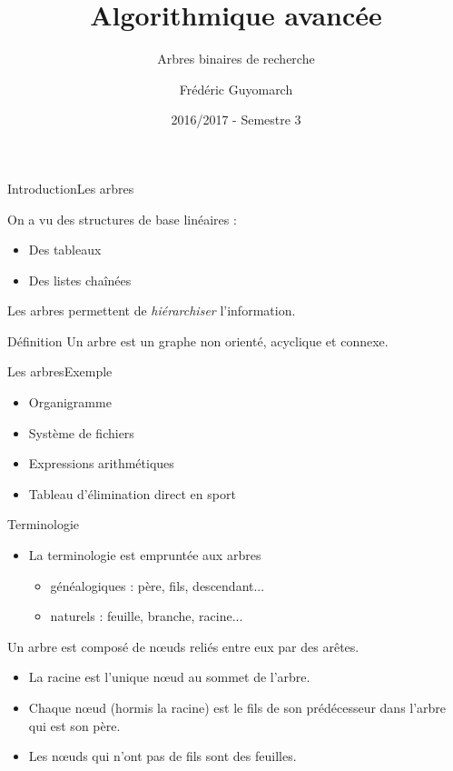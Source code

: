 \documentclass[12pt,a4paper]{beamer}
\title{\textbf{Algorithmique avancée}}
\subtitle{Arbres binaires de recherche}
\author{Frédéric Guyomarch}
\date{2016/2017 - Semestre 3}
\institute %
{

  Université de Lille1\\
  IUT-A de Lille

}
\newcommand{\hl}[1]{\textcolor{blueemph}{#1}}
\begin{document}
\begin{frame}
\titlepage
\end{frame}


\begin{frame}{Introduction}{Les arbres}

On a vu des structures de base linéaires : 
\begin{itemize}
\item Des tableaux
\item Des listes chaînées
\end{itemize}
Les arbres permettent de \emph{hiérarchiser} l'information.
\begin{block}{Définition}
Un arbre est un graphe non orienté, acyclique et connexe.
\end{block}
\end{frame}

\begin{frame}{Les arbres}{Exemple}
\begin{itemize}
\item Organigramme
\item Système de fichiers
\item Expressions arithmétiques
\item Tableau d'élimination direct en sport
\end{itemize}

\end{frame}



\begin{frame}{Terminologie}{}

\begin{itemize}
\item La terminologie est empruntée aux arbres 
\begin{itemize}
\item généalogiques : père, fils, descendant...
\item naturels : feuille, branche, racine...
\end{itemize} 
\end{itemize}
Un arbre est composé de \hl{n\oe uds} reliés entre eux par des \hl{arêtes}.
\begin{itemize}
\item La \hl{racine} est l'unique n\oe ud au sommet de l'arbre. 
\item Chaque n\oe ud (hormis la racine) est le \hl{fils} de son prédécesseur dans l'arbre qui est son \hl{père}. 
\item Les n\oe uds qui n'ont pas de fils sont des \hl{feuilles}.
\end{itemize}
\end{frame}
\end{document}
